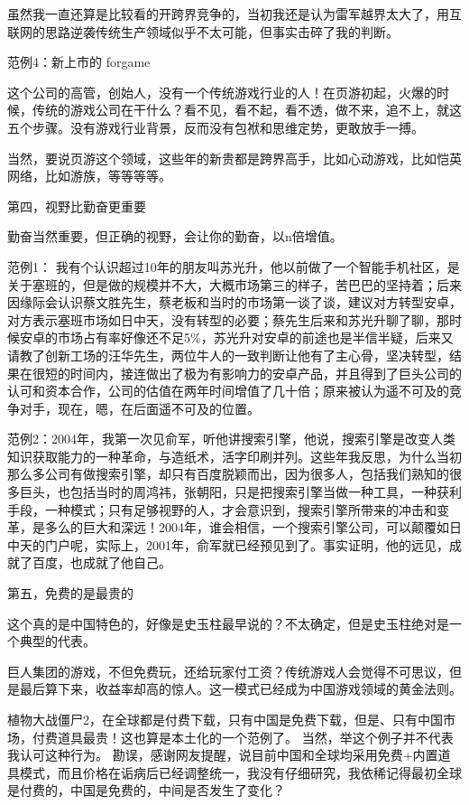       虽然我一直还算是比较看的开跨界竞争的，当初我还是认为雷军越界太大了，用互联网的思路逆袭传统生产领域似乎不太可能，但事实击碎了我的判断。

   范例4：新上市的 forgame

      这个公司的高管，创始人，没有一个传统游戏行业的人！在页游初起，火爆的时候，传统的游戏公司在干什么？看不见，看不起，看不透，做不来，追不上，就这五个步骤。没有游戏行业背景，反而没有包袱和思维定势，更敢放手一搏。

    当然，要说页游这个领域，这些年的新贵都是跨界高手，比如心动游戏，比如恺英网络，比如游族，等等等等。


第四，视野比勤奋更重要

   勤奋当然重要，但正确的视野，会让你的勤奋，以n倍增值。

  范例1： 我有个认识超过10年的朋友叫苏光升，他以前做了一个智能手机社区，是关于塞班的，但是做的规模并不大，大概市场第三的样子，苦巴巴的坚持着；后来因缘际会认识蔡文胜先生，蔡老板和当时的市场第一谈了谈，建议对方转型安卓，对方表示塞班市场如日中天，没有转型的必要；蔡先生后来和苏光升聊了聊，那时候安卓的市场占有率好像还不足5\%，苏光升对安卓的前途也是半信半疑，后来又请教了创新工场的汪华先生，两位牛人的一致判断让他有了主心骨，坚决转型，结果在很短的时间内，接连做出了极为有影响力的安卓产品，并且得到了巨头公司的认可和资本合作，公司的估值在两年时间增值了几十倍；原来被认为遥不可及的竞争对手，现在，嗯，在后面遥不可及的位置。


 范例2：2004年，我第一次见俞军，听他讲搜索引擎，他说，搜索引擎是改变人类知识获取能力的一种革命，与造纸术，活字印刷并列。这些年我反思，为什么当初那么多公司有做搜索引擎，却只有百度脱颖而出，因为很多人，包括我们熟知的很多巨头，也包括当时的周鸿祎，张朝阳，只是把搜索引擎当做一种工具，一种获利手段，一种模式；只有足够视野的人，才会意识到，搜索引擎所带来的冲击和变革，是多么的巨大和深远！2004年，谁会相信，一个搜索引擎公司，可以颠覆如日中天的门户呢，实际上，2001年，俞军就已经预见到了。事实证明，他的远见，成就了百度，也成就了他自己。


第五，免费的是最贵的

这个真的是中国特色的，好像是史玉柱最早说的？不太确定，但是史玉柱绝对是一个典型的代表。

巨人集团的游戏，不但免费玩，还给玩家付工资？传统游戏人会觉得不可思议，但是最后算下来，收益率却高的惊人。这一模式已经成为中国游戏领域的黄金法则。

植物大战僵尸2，在全球都是付费下载，只有中国是免费下载，但是、只有中国市场，付费道具最贵！这也算是本土化的一个范例了。 当然，举这个例子并不代表我认可这种行为。 勘误，感谢网友提醒，说目前中国和全球均采用免费+内置道具模式，而且价格在诟病后已经调整统一，我没有仔细研究，我依稀记得最初全球是付费的，中国是免费的，中间是否发生了变化？

